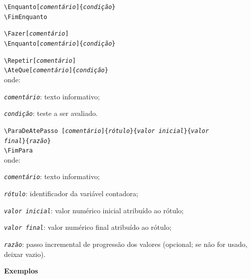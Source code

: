 \documentclass[a4paper,12pt,oneside,onecolumn,final,fleqn]{repUERJ}
\begin{document}
\begin{alinea}
  \item \texttt{\textbackslash Enquanto[\textit{comentário}]\{\textit{condição}\}}\\
        \texttt{\textbackslash FimEnquanto}
  \item \texttt{\textbackslash Fazer[\textit{comentário}]}\\
        \texttt{\textbackslash Enquanto[\textit{comentário}]\{\textit{condição}\}}
  \item \texttt{\textbackslash Repetir[\textit{comentário}]}\\
        \texttt{\textbackslash AteQue[\textit{comentário}]\{\textit{condição}\}}\\
        onde:
        \begin{alinea}
            \item \textit{\texttt{comentário}}: texto
                  informativo;
            \item \textit{\texttt{condição}}: teste a ser
                  avaliado.
        \end{alinea}
  \item \texttt{\textbackslash ParaDeAtePasso [\textit{comentário}]\{\textit{rótulo}\}\{\textit{valor inicial}\}\{\textit{valor \\final}\}\{\textit{razão}\}}\\
        \texttt{\textbackslash FimPara}\\
        onde:
        \begin{alinea}
            \item \textit{\texttt{comentário}}: texto
                  informativo;
            \item \textit{\texttt{rótulo}}: identificador da
                  variável contadora;
            \item \textit{\texttt{valor inicial}}: 
                  valor numérico inicial atribuído ao rótulo;
            \item \textit{\texttt{valor final}}: 
                  valor numérico final atribuído ao rótulo;
            \item \textit{\texttt{razão}}: 
                  passo incremental de progressão dos valores
                  (opcional; se não for usado, deixar vazio).\\
        \end{alinea}
\end{alinea}

\noindent\textbf{Exemplos}
\end{document}
